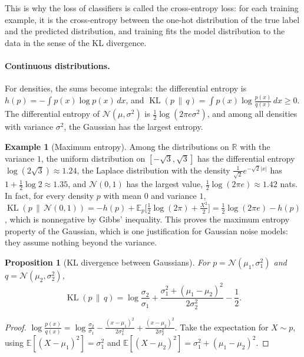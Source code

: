 \documentclass[11pt]{article}
\newcommand{\E}{\mathbb{E}}
\DeclareMathOperator{\KL}{KL}
\theoremstyle{definition}
\newtheorem{example}[definition]{Example}
\theoremstyle{plain}
\newtheorem{proposition}[definition]{Proposition}
\theoremstyle{remark}
\begin{document}
This is why the loss of classifiers is called the cross-entropy loss: for each training example, it is the cross-entropy between the one-hot distribution of the true label and the predicted distribution, and training fits the model distribution to the data in the sense of the KL divergence.

\paragraph{Continuous distributions.} For densities, the sums become integrals: the differential entropy is $h(p) = -\int p(x)\log p(x)\, dx$, and $\KL(p \,\|\, q) = \int p(x)\log\frac{p(x)}{q(x)}\, dx \geq 0$. The differential entropy of $\mathcal{N}(\mu, \sigma^2)$ is $\frac{1}{2}\log(2\pi e\sigma^2)$, and among all densities with variance $\sigma^2$, the Gaussian has the largest entropy.

\begin{example}[Maximum entropy]\label{ex:max-entropy}
    Among the distributions on $\mathbb{R}$ with the variance $1$, the uniform distribution on $[-\sqrt{3}, \sqrt{3}]$ has the differential entropy $\log(2\sqrt{3}) \approx 1.24$, the Laplace distribution with the density $\frac{1}{\sqrt{2}}e^{-\sqrt{2}|x|}$ has $1 + \frac{1}{2}\log 2 \approx 1.35$, and $\mathcal{N}(0, 1)$ has the largest value, $\frac{1}{2}\log(2\pi e) \approx 1.42$ nats. In fact, for every density $p$ with mean $0$ and variance $1$, $\KL(p \,\|\, \mathcal{N}(0, 1)) = -h(p) + \E_p\big[\frac{1}{2}\log(2\pi) + \frac{X^2}{2}\big] = \frac{1}{2}\log(2\pi e) - h(p)$, which is nonnegative by Gibbs' inequality. This proves the maximum entropy property of the Gaussian, which is one justification for Gaussian noise models: they assume nothing beyond the variance.
\end{example}

\begin{proposition}[KL divergence between Gaussians]\label{prop:kl-gaussian}
    For $p = \mathcal{N}(\mu_1, \sigma_1^2)$ and $q = \mathcal{N}(\mu_2, \sigma_2^2)$,
    \[\KL(p \,\|\, q) = \log\frac{\sigma_2}{\sigma_1} + \frac{\sigma_1^2 + (\mu_1 - \mu_2)^2}{2\sigma_2^2} - \frac{1}{2}.\]
\end{proposition}

\begin{proof}
    $\log\frac{p(x)}{q(x)} = \log\frac{\sigma_2}{\sigma_1} - \frac{(x - \mu_1)^2}{2\sigma_1^2} + \frac{(x - \mu_2)^2}{2\sigma_2^2}$. Take the expectation for $X \sim p$, using $\E[(X - \mu_1)^2] = \sigma_1^2$ and $\E[(X - \mu_2)^2] = \sigma_1^2 + (\mu_1 - \mu_2)^2$.
\end{proof}
\end{document}
